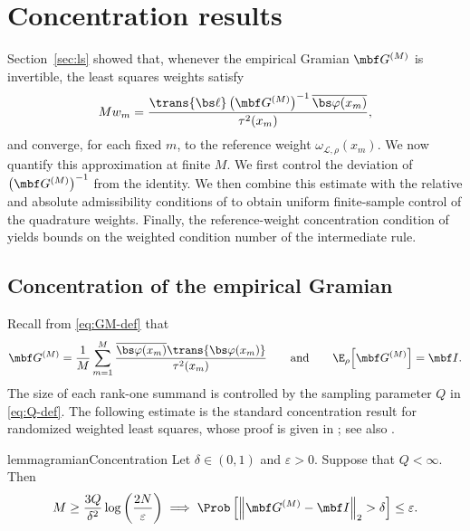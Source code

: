\documentclass[10pt,dvipsnames]{amsart}
\begin{document}
\section{Concentration results}
\label{sec:posls}

Section~\ref{sec:ls} showed that, whenever the empirical Gramian \(\mbf G^{(M)}\) is invertible, the least squares weights satisfy 
\[ 
    M w_m = \frac{ \trans{\bs\ell} \left(\mbf G^{(M)}\right)^{-1} \overline{\bs\varphi(x_m)} }{\tau^2(x_m)}, 
\] 
and converge, for each fixed \(m\), to the reference weight \(\omega_{\mathcal L,\rho}(x_m)\). We now quantify this approximation at finite \(M\). We first control the deviation of \(\left(\mbf G^{(M)}\right)^{-1}\) from the identity. We then combine this estimate with the relative and absolute admissibility conditions of  to obtain uniform finite-sample control of the quadrature weights. Finally, the reference-weight concentration condition of  yields bounds on the weighted condition number of the intermediate rule.

\subsection{Concentration of the empirical Gramian}
\label{subsec:gramian-concentration}

Recall from \eqref{eq:GM-def} that 
\[ 
    \mbf G^{(M)} = \frac{1}{M} \sum_{m=1}^M \frac{ \overline{\bs\varphi(x_m)} \trans{\bs\varphi(x_m)} }{\tau^2(x_m)} 
    \qquad\text{and}\qquad 
    \E_\rho\!\left[\mbf G^{(M)}\right] = \mbf I.
\]
The size of each rank-one summand is controlled by the sampling parameter \(Q\) in \eqref{eq:Q-def}. The following estimate is the standard concentration result for randomized
weighted least squares, whose proof is given in ; see also \cite{cohen_stability_2013,cohen_optimal_2017}.

\begin{restatable}{lemma}{gramianConcentration}
\label{lemma:G-chernoff}
    Let \(\delta\in(0,1)\) and \(\varepsilon>0\).  Suppose that \(Q<\infty\).
    Then
    \begin{align}
        \label{eq:Ghat-sampling-criterion}
        M
        \ge
        \frac{3Q}{\delta^2}
        \log\left(\frac{2N}{\varepsilon}\right)
        \implies
        \Prob\left[
            \left\|\mbf G^{(M)}-\mbf I\right\|_2>\delta
        \right]
        \leq \varepsilon .
    \end{align}
\end{restatable}
\end{document}
